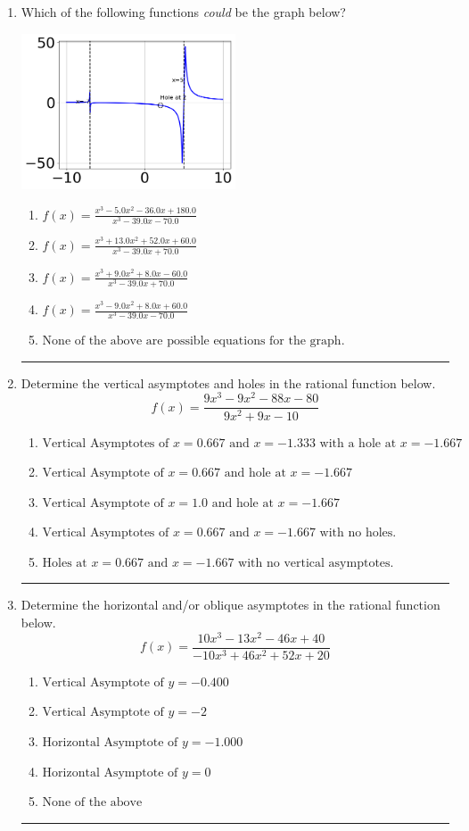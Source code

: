 \documentclass[14pt]{extbook}
\newcommand{\litem}[1]{\item#1\hspace*{-1cm}\rule{\textwidth}{0.4pt}}
\begin{document}
\begin{enumerate}
{\begin{enumerate}[label=\Alph*.]
\end{enumerate} }
\litem{
Which of the following functions \textit{could} be the graph below?
\begin{center}
    \includegraphics[width=0.5\textwidth]{../Figures/identifyGraphOfRationalFunctionC.png}
\end{center}
\begin{enumerate}[label=\Alph*.]
\item \( f(x)=\frac{x^{3} -5.0 x^{2} -36.0 x + 180.0}{x^{3} -39.0 x -70.0} \)
\item \( f(x)=\frac{x^{3} +13.0 x^{2} +52.0 x + 60.0}{x^{3} -39.0 x + 70.0} \)
\item \( f(x)=\frac{x^{3} +9.0 x^{2} +8.0 x -60.0}{x^{3} -39.0 x + 70.0} \)
\item \( f(x)=\frac{x^{3} -9.0 x^{2} +8.0 x + 60.0}{x^{3} -39.0 x -70.0} \)
\item \( \text{None of the above are possible equations for the graph.} \)

\end{enumerate} }
\litem{
Determine the vertical asymptotes and holes in the rational function below.\[ f(x) = \frac{9x^{3} -9 x^{2} -88 x -80}{9x^{2} +9 x -10} \]\begin{enumerate}[label=\Alph*.]
\item \( \text{Vertical Asymptotes of } x = 0.667 \text{ and } x = -1.333 \text{ with a hole at } x = -1.667 \)
\item \( \text{Vertical Asymptote of } x = 0.667 \text{ and hole at } x = -1.667 \)
\item \( \text{Vertical Asymptote of } x = 1.0 \text{ and hole at } x = -1.667 \)
\item \( \text{Vertical Asymptotes of } x = 0.667 \text{ and } x = -1.667 \text{ with no holes.} \)
\item \( \text{Holes at } x = 0.667 \text{ and } x = -1.667 \text{ with no vertical asymptotes.} \)

\end{enumerate} }
\litem{
Determine the horizontal and/or oblique asymptotes in the rational function below.\[ f(x) = \frac{10x^{3} -13 x^{2} -46 x + 40}{-10x^{3} +46 x^{2} +52 x + 20} \]\begin{enumerate}[label=\Alph*.]
\item \( \text{Vertical Asymptote of } y = -0.400  \)
\item \( \text{Vertical Asymptote of } y = -2  \)
\item \( \text{Horizontal Asymptote of } y = -1.000  \)
\item \( \text{Horizontal Asymptote of } y = 0  \)
\item \( \text{None of the above} \)


\end{enumerate}}
\end{enumerate}
\end{document}
